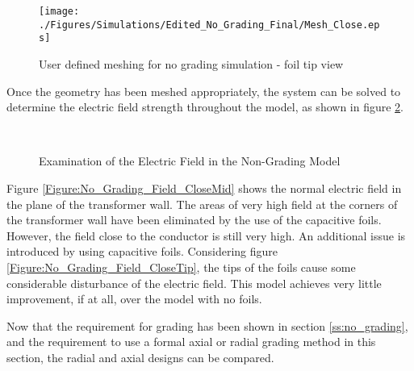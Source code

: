 \begin{figure}[!h]
  \centering
    \texttt{[image: ./Figures/Simulations/Edited\_No\_Grading\_Final/Mesh\_Close.eps]} 
	\caption{User defined meshing for no grading simulation - foil tip view}
\label{Figure:No_Grading_Mesh2}
\end{figure}

Once the geometry has been meshed appropriately, the system can be solved to determine the electric field strength throughout the model, as shown in figure \ref{Figure:No_Grading_Fieldxy}.


\begin{figure}[!h]
  \centering
   \\

 \quad
{}
\caption{Examination of the Electric Field in the Non-Grading Model}
\label{Figure:No_Grading_Fieldxy}
\end{figure}

Figure \ref{Figure:No_Grading_Field_CloseMid} shows the normal electric field in the plane of the transformer wall. 
The areas of very high field at the corners of the transformer wall have been eliminated by the use of the capacitive foils.
However, the field close to the conductor is still very high.
An additional issue is introduced by using capacitive foils.
Considering figure \ref{Figure:No_Grading_Field_CloseTip}, the tips of the foils cause some considerable disturbance of the electric field.
This model achieves very little improvement, if at all, over the model with no foils.

Now that the requirement for grading has been shown in section \ref{ss:no_grading}, and the requirement to use a formal axial or radial grading method in this section, the radial and axial designs can be compared.


